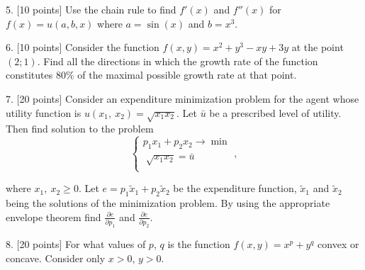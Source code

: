 \documentclass[12pt,a4paper]{article}
\begin{document}
5. {[10 points]} 
Use the chain rule to find $f'(x)$ and $f''(x)$ for $f(x)=u(a,b,x)$ where $a=\sin(x)$ and $b=x^3$.

\newpage
{}

  6. {[10 points]}
Consider the function $f(x,y)=x^2+y^3-xy+3y$ at the point $(2;1)$. Find all the directions in which the  growth rate of the function constitutes $80\%$ of the maximal possible growth rate at that point.





\newpage
{}

  7. {[20 points]} 
Consider an expenditure minimization problem for the agent whose utility function is $u({{x}_{1}},\ {{x}_{2}})=\sqrt{{{x}_{1}}{{x}_{2}}}$. Let $\bar{u}$ be a prescribed level of utility. Then find solution to the problem 
\[
  \begin{cases}
    {{p}_{1}}{{x}_{1}}+{{p}_{2}}{{x}_{2}}\to \min   \\
    \sqrt[{}]{{{x}_{1}}{{x}_{2}}}=\bar{u}  \\
  \end{cases},
\]

where ${x}_{1},\ {{x}_{2}}\ge 0$. Let $e={{p}_{1}}{{\tilde{x}}_{1}}+{{p}_{2}}{{\tilde{x}}_{2}}$ be the expenditure function, ${{\tilde{x}}_{1}}$ and ${{\tilde{x}}_{2}}$ being the solutions of the minimization problem. By using the appropriate envelope theorem find $\frac{\partial e}{\partial {{p}_{1}}}$ and $\frac{\partial e}{\partial {{p}_{2}}}$.

\newpage
{}

  8. {[20 points]} For what values of $p$, $q$ is the function $f(x,y)={{x}^{p}}+{{y}^{q}}$ convex or concave. Consider only $x>0$, $y>0$.
\end{document}
